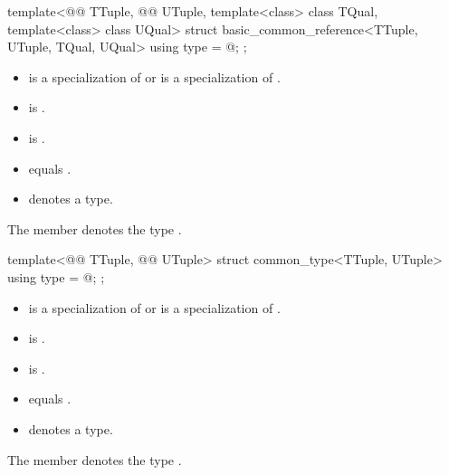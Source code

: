 %
\begin{itemdecl}
template<@@ TTuple, @@ UTuple,
         template<class> class TQual, template<class> class UQual>
struct basic_common_reference<TTuple, UTuple, TQual, UQual> {
  using type = @\seebelow@;
};
\end{itemdecl}

\begin{itemdescr}
\pnum
\constraints
\begin{itemize}
\item
{} is a specialization of  or
 is a specialization of .
\item
{} is .
\item
{} is .
\item
{} equals .
\item
{}
denotes a type.
\end{itemize}
The member   denotes the type
.
\end{itemdescr}

%
\begin{itemdecl}
template<@@ TTuple, @@ UTuple>
struct common_type<TTuple, UTuple> {
  using type = @\seebelow@;
};
\end{itemdecl}

\begin{itemdescr}
\pnum
\constraints
\begin{itemize}
\item
{} is a specialization of  or
 is a specialization of .
\item
{} is .
\item
{} is .
\item
{} equals .
\item
{} denotes a type.
\end{itemize}
The member   denotes the type
.
\end{itemdescr}


